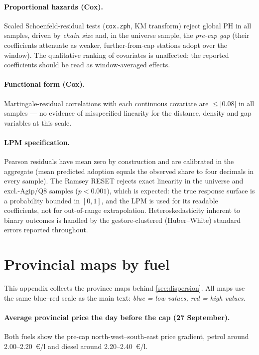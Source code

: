 \documentclass[11pt]{article}
\begin{document}
\paragraph{Proportional hazards (Cox).} Scaled Schoenfeld-residual
tests (\texttt{cox.zph}, KM transform) reject global PH in all samples,
driven by \emph{chain size} and, in the universe sample, the
\emph{pre-cap gap} (their coefficients attenuate as weaker,
further-from-cap stations adopt over the window). The qualitative
ranking of covariates is unaffected; the reported coefficients should
be read as window-averaged effects.

\paragraph{Functional form (Cox).} Martingale-residual correlations
with each continuous covariate are $\le |0.08|$ in all samples ---
no evidence of misspecified linearity for the distance, density and
gap variables at this scale.

\paragraph{LPM specification.} Pearson residuals have mean zero by
construction and are calibrated in the aggregate (mean predicted
adoption equals the observed share to four decimals in every sample).
The Ramsey RESET rejects exact linearity in the universe and
excl.-Agip/Q8 samples ($p < 0.001$), which is expected: the true
response surface is a probability bounded in $[0,1]$, and the LPM is
used for its readable coefficients, not for out-of-range extrapolation.
Heteroskedasticity inherent to binary outcomes is handled by the
gestore-clustered (Huber--White) standard errors reported throughout.

\clearpage
\section{Provincial maps by fuel}
\label{app:maps}

This appendix collects the province maps behind
\cref{sec:dispersion}. All maps use the same blue--red scale as the
main text: \emph{blue = low values, red = high values}.

\paragraph{Average provincial price the day before the cap (27
September).} Both fuels show the pre-cap north-west--south-east price
gradient, petrol around 2.00--2.20~\euro/l and diesel around
2.20--2.40~\euro/l.
\end{document}
